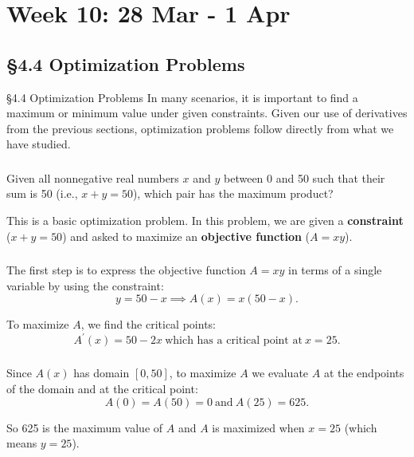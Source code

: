 \documentclass[cal1spr16Lectures.tex]{subfiles}
\begin{document}
\section[Week 10]{Week 10: 28 Mar - 1 Apr}

\subsection[4.4 Optimization Problems]{\S 4.4 Optimization Problems}

\begin{frame}{\S 4.4 Optimization Problems}
\small
In many scenarios, it is important to find a maximum or minimum value under given constraints.  Given our use of derivatives from the previous sections, optimization problems follow directly from what we have studied.
\end{frame}

\begin{frame}
\frametitle{}
\small
\begin{que} Given all nonnegative real numbers $x$ and $y$ between 0 and 50 such that their sum is 50 (i.e., $x+y=50$), which pair has the maximum product? \end{que}

\vspace{2pc}
This is a basic optimization problem.  In this problem, we are given a \alert{\bf constraint} ($x+y=50$) and asked to maximize an \alert{\bf objective function} ($A=xy$).
\end{frame}

\begin{frame}
\frametitle{}
\small
The first step is to express the objective function $A=xy$ in terms of a \alert{single variable} by using the constraint:
\[y=50-x \implies A(x)=x(50-x).\]

\vspace{2pc}
To maximize $A$, we find the critical points:
\[A^{\prime}(x)=50-2x\ \text{which has a critical point at}\ x=25.\]
\end{frame}

\begin{frame}
\frametitle{}
Since $A(x)$ has domain $[0,50]$, to maximize $A$ we evaluate $A$ \alert{at the endpoints of the domain and at the critical point}:
\[A(0)=A(50)=0\ \text{and}\ A(25)=625.\]

\vspace{2pc}
So 625 is the maximum value of $A$ and $A$ is maximized when $x=25$ (which means $y=25$).
\end{frame}
\end{document}
